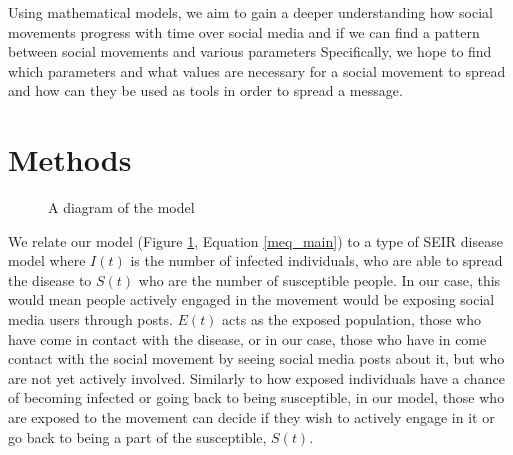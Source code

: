 \documentclass{article}
\begin{document}
    Using mathematical models, we aim to gain a deeper understanding how social movements progress with time over social media and if we can find a pattern between social movements and various parameters Specifically, we hope to find which parameters and what values are necessary for a social movement to spread and how can they be used as tools in order to spread a message.

    \section{Methods}
   

    \begin{figure}
        \centering
        
        \caption{A diagram of the model}
        \label{fig:model_diagram}
    \end{figure}
    
    We relate our model (Figure \ref{fig:model_diagram}, Equation \ref{meq_main}) to a type of SEIR disease model where $I(t)$ is the number of infected individuals, who are able to spread the disease to $S(t)$ who are the number of susceptible people. In our case, this would mean people actively engaged in the movement would be exposing social media users through posts. $E(t)$ acts as the exposed population, those who have come in contact with the disease, or in our case, those who have in come contact with the social movement by seeing social media posts about it, but who are not yet actively involved. Similarly to how exposed individuals have a chance of becoming infected or going back to being susceptible, in our model, those who are exposed to the movement can decide if they wish to actively engage in it or go back to being a part of the susceptible, $S(t)$.
\end{document}
